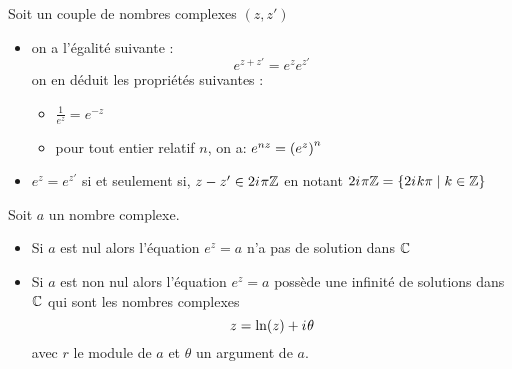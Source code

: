 \begin{prop}
    Soit un couple de nombres complexes \((z,z')\)
    \begin{itemize}
        \item on a l'égalité suivante : 
        \[e^{z+z'} = e^ze^{z'}\]
        on en déduit les propriétés suivantes :
        \begin{itemize}
            \item \(\frac{1}{e^z} = e^{-z}\)
            \item pour tout entier relatif \(n\), on a: \(e^{nz} = \left(e^z\right)^n\)
        \end{itemize}
        \item \(e^z = e^{z'}\) si et seulement si, \(z-z' \in 2i\mkern1mu\pi \mathbb{Z}\) en notant \(2i\mkern1mu \pi \mathbb{Z} =\left\lbrace2i\mkern1mu k \pi \;\middle|\; k\in \mathbb{Z}\right\rbrace\)
    \end{itemize}
\end{prop}
\begin{defprop}[Résolution de l'équations \(e^z = a\) avec \(a\) un nombre complexe]
    Soit \(a\) un nombre complexe. \\
    \begin{itemize}
        \item Si \(a\) est nul alors l'équation \(e^z = a\) n'a pas de solution dans \(\mathbb{C}\)
        \item Si \(a\) est non nul alors l'équation \(e^z = a\) possède une infinité de solutions dans \(\mathbb{C}\) qui sont les nombres complexes 
        \[z= \ln(z)+i\mkern1mu \theta\]
        avec \(r\) le module de \(a\) et \(\theta\) un argument de \(a\).
    \end{itemize}
\end{defprop}

